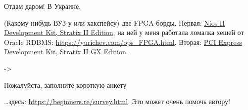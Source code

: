 \vspace*{\fill}

\huge
	Отдам даром! В Украине.
\normalsize

\bigskip
\bigskip
\bigskip

(Какому-нибудь ВУЗ-у или хакспейсу) две FPGA-борды.
Первая: \href{https://www.altera.com/products/boards_and_kits/dev-kits/altera/kit-niosii-2s60.html}{Nios II Development Kit, Stratix II Edition}, на ней у меня работала ломалка хешей от Oracle RDBMS:
\url{https://yurichev.com/ops_FPGA.html}.
Вторая: \href{https://www.altera.com/products/boards_and_kits/dev-kits/altera/kit-pciexpress_s2gx.html}{PCI Express Development Kit, Stratix II GX Edition}.

-> \EMAIL

\bigskip
\bigskip
\bigskip

\huge
	Пожалуйста, заполните короткую анкету
\normalsize

\bigskip
\bigskip
\bigskip

\dots здесь: \url{https://beginners.re/survey.html}.
Это может очень помочь автору!

\vspace*{\fill}
\vfill
